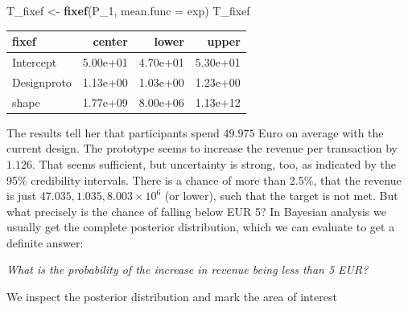 \documentclass[]{svmono}
\newenvironment{Shaded}{\begin{snugshade}}{\end{snugshade}}
\newcommand{\KeywordTok}[1]{\textcolor[rgb]{0.13,0.29,0.53}{\textbf{#1}}}
\newcommand{\DataTypeTok}[1]{\textcolor[rgb]{0.13,0.29,0.53}{#1}}
\newcommand{\DecValTok}[1]{\textcolor[rgb]{0.00,0.00,0.81}{#1}}
\newcommand{\StringTok}[1]{\textcolor[rgb]{0.31,0.60,0.02}{#1}}
\newcommand{\NormalTok}[1]{#1}
\begin{document}
\begin{Shaded}
\begin{Highlighting}[]
\NormalTok{T_fixef <-}\StringTok{ }\KeywordTok{fixef}\NormalTok{(P_}\DecValTok{1}\NormalTok{, }\DataTypeTok{mean.func =}\NormalTok{ exp)}
\NormalTok{T_fixef}
\end{Highlighting}
\end{Shaded}

\begin{longtable}[]{@{}lrrr@{}}
\toprule
fixef & center & lower & upper\tabularnewline
\midrule
\endhead
Intercept & 5.00e+01 & 4.70e+01 & 5.30e+01\tabularnewline
Designproto & 1.13e+00 & 1.03e+00 & 1.23e+00\tabularnewline
shape & 1.77e+09 & 8.00e+06 & 1.13e+12\tabularnewline
\bottomrule
\end{longtable}

The results tell her that participants spend \(49.975\) Euro on average
with the current design. The prototype seems to increase the revenue per
transaction by \(1.126\). That seems sufficient, but uncertainty is
strong, too, as indicated by the 95\% credibility intervals. There is a
chance of more than 2.5\%, that the revenue is just
\(47.035, 1.035, 8.003\times 10^{6}\) (or lower), such that the target
is not met. But what precisely is the chance of falling below EUR 5? In
Bayesian analysis we usually get the complete posterior distribution,
which we can evaluate to get a definite answer:

\emph{What is the probability of the increase in revenue being less than
5 EUR?}

We inspect the posterior distribution and mark the area of interest
\end{document}
